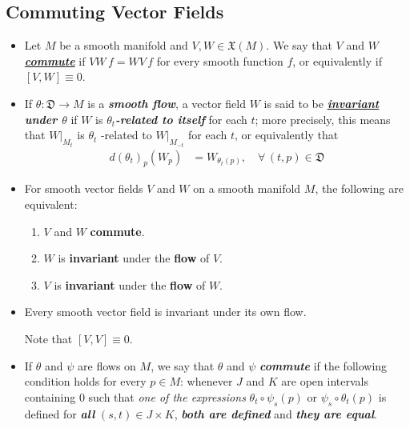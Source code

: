 \documentclass[11pt]{article}
\begin{document}
\subsection{Commuting Vector Fields}
\begin{itemize}
\item \begin{definition}
Let $M$ be a smooth manifold and $V, W \in \mathfrak{X}(M)$. We say that $V$ and $W$ \underline{\emph{\textbf{commute}}} if $VW\,f = WV\,f$ for every smooth function $f$, or equivalently if $[V, W] \equiv 0$. 
\end{definition}

\item \begin{definition}
If $\theta: \mathfrak{D} \rightarrow M$ is a \emph{\textbf{smooth flow}}, a vector field $W$ is said to be \emph{\textbf{\underline{invariant} under $\theta$}} if $W$ is \emph{\textbf{$\theta_t$-related to itself}} for each $t$; more precisely, this means that $W|_{M_t}$ is $\theta_t$ -related to $W|_{M_{-t}}$ for each $t$, or equivalently that 
\begin{align*}
d(\theta_{t})_{p}(W_p) &= W_{\theta_t(p)}, \quad \forall\,(t,p) \in \mathfrak{D}
\end{align*}
\end{definition}

\item \begin{theorem}
For smooth vector fields $V$ and $W$ on a smooth manifold $M$,  the following are equivalent:
\begin{enumerate}
\item $V$ and $W$ \textbf{commute}.
\item $W$ is \textbf{invariant} under the \textbf{flow} of $V$.
\item $V$ is \textbf{invariant} under the \textbf{flow} of $W$.
\end{enumerate}
\end{theorem}

\item \begin{corollary}
Every smooth vector field is invariant under its own flow.
\end{corollary} Note that $[V, V] \equiv 0$.

\item \begin{definition}
If $\theta$ and $\psi$ are flows on $M$, we say that $\theta$ and $\psi$ \emph{\textbf{commute}} if the following condition holds for every $p \in M$: 
whenever $J$ and $K$ are open intervals containing $0$ such that \emph{one of the expressions} $\theta_t \circ \psi_s(p)$ or $\psi_s  \circ \theta_t (p)$ is defined for \emph{\textbf{all}} $(s, t) \in J \times K$, \emph{\textbf{both are defined}} and \textbf{\emph{they are equal}}.


\end{definition}
\end{itemize}
\end{document}
